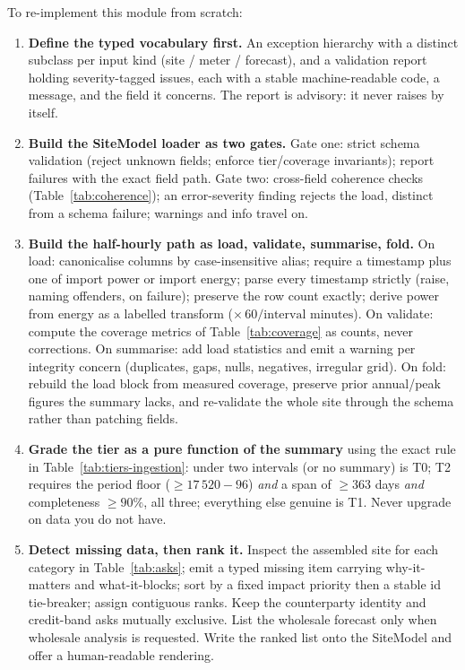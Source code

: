 \begin{rebuild}
To re-implement this module from scratch:
\begin{enumerate}
  \item \textbf{Define the typed vocabulary first.} An exception hierarchy with a distinct subclass per input kind (site / meter / forecast), and a validation report holding severity-tagged issues, each with a stable machine-readable code, a message, and the field it concerns. The report is advisory: it never raises by itself.
  \item \textbf{Build the SiteModel loader as two gates.} Gate one: strict schema validation (reject unknown fields; enforce tier/coverage invariants); report failures with the exact field path. Gate two: cross-field coherence checks (Table~\ref{tab:coherence}); an error-severity finding rejects the load, distinct from a schema failure; warnings and info travel on.
  \item \textbf{Build the half-hourly path as load, validate, summarise, fold.} On load: canonicalise columns by case-insensitive alias; require a timestamp plus one of import power or import energy; parse every timestamp strictly (raise, naming offenders, on failure); preserve the row count exactly; derive power from energy as a labelled transform ($\times\,60/\text{interval minutes}$). On validate: compute the coverage metrics of Table~\ref{tab:coverage} as counts, never corrections. On summarise: add load statistics and emit a warning per integrity concern (duplicates, gaps, nulls, negatives, irregular grid). On fold: rebuild the load block from measured coverage, preserve prior annual/peak figures the summary lacks, and re-validate the whole site through the schema rather than patching fields.
  \item \textbf{Grade the tier as a pure function of the summary} using the exact rule in Table~\ref{tab:tiers-ingestion}: under two intervals (or no summary) is T0; T2 requires the period floor ($\ge 17\,520 - 96$) \emph{and} a span of $\ge 363$ days \emph{and} completeness $\ge 90\%$, all three; everything else genuine is T1. Never upgrade on data you do not have.
  \item \textbf{Detect missing data, then rank it.} Inspect the assembled site for each category in Table~\ref{tab:asks}; emit a typed missing item carrying why-it-matters and what-it-blocks; sort by a fixed impact priority then a stable id tie-breaker; assign contiguous ranks. Keep the counterparty identity and credit-band asks mutually exclusive. List the wholesale forecast only when wholesale analysis is requested. Write the ranked list onto the SiteModel and offer a human-readable rendering.

\end{enumerate}
\end{rebuild}
